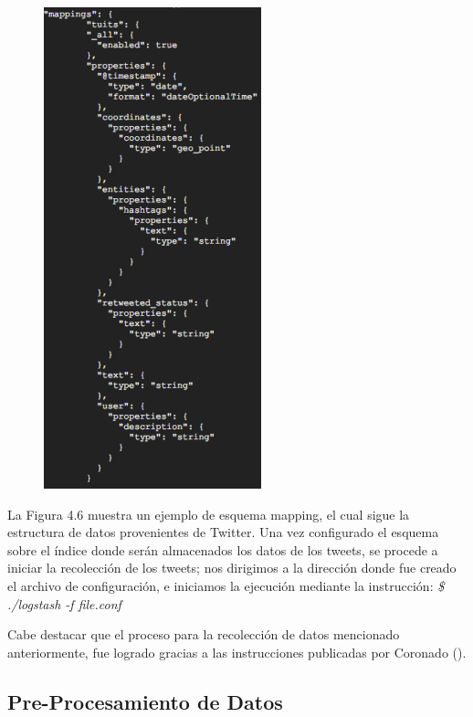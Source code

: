 \begin{figure}[H]
	\centering
	\includegraphics[height=0.47\textheight]{fig01/recolector_mapp}
	\label{fig:RHP02}
\end{figure}

La Figura 4.6 muestra un ejemplo de esquema mapping, el cual sigue la estructura de datos provenientes de Twitter. Una vez configurado el esquema sobre el índice donde serán almacenados los datos de los tweets, se procede a iniciar la recolección de los tweets; nos dirigimos a la dirección donde fue creado el archivo de configuración, e iniciamos la ejecución mediante la instrucción:
\textit{\$ ./logstash -f file.conf}

Cabe destacar que el proceso para la recolección de datos mencionado anteriormente, fue logrado gracias a las instrucciones publicadas por Coronado (\citeyear{recolector_tweets}).

\subsection{Pre-Procesamiento de Datos}
\label{subsec:subsec04}

